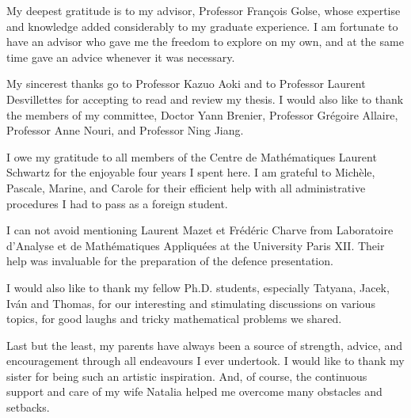 My deepest gratitude is to my advisor, Professor François Golse, whose expertise and knowledge added considerably to my graduate experience. I am fortunate to have an advisor who gave me the freedom to explore on my own, and at the same time gave an advice whenever it was necessary.

My sincerest thanks go to Professor Kazuo Aoki and to Professor Laurent Desvillettes for accepting to read and review my thesis. I would also like to thank the members of my committee, Doctor Yann Brenier, Professor Grégoire Allaire, Professor Anne Nouri, and Professor Ning Jiang. 

I owe my gratitude to all members of the Centre de Mathématiques Laurent Schwartz for the enjoyable four years I spent here. I am grateful to Michèle, Pascale, Marine, and Carole for their efficient help with all administrative procedures I had to pass as a foreign student.

I can not avoid mentioning Laurent Mazet et Frédéric Charve from  Laboratoire d'Analyse et de Mathématiques Appliquées at the University Paris XII. Their help was invaluable for the preparation of the defence presentation.

I would also like to thank my fellow Ph.D. students, especially Tatyana, Jacek, Iván and Thomas, for our interesting and stimulating discussions on various topics, for good laughs and tricky mathematical problems we shared.

Last but the least, my parents have always been a source of strength, advice, and encouragement through all endeavours I ever undertook. I would like to thank my sister for being such an artistic inspiration. And, of course, the continuous support and care of my wife Natalia helped me overcome many obstacles and setbacks.
